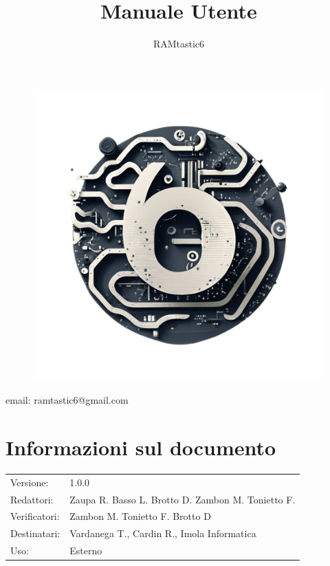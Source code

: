 \documentclass[12pt, oneside]{article}
\author{RAMtastic6}
\begin{document}
\thispagestyle{empty}
\title{Manuale Utente}
\maketitle
\begin{figure}[h]
  \centering
  \includegraphics[scale=0.3]{logo.png}
\end{figure}
\begin{center}
    email: ramtastic6@gmail.com
\end{center}

\section*{Informazioni sul documento} 
\begin{tabular}{ll}
Versione: & 1.0.0 \\
Redattori: &  Zaupa R. Basso L. Brotto D. Zambon M. Tonietto F.\\ 
Verificatori: & Zambon M. Tonietto F. Brotto D\\
Destinatari: & Vardanega T., Cardin R., Imola Informatica \\
Uso: & Esterno
\end{tabular}
\newpage

\end{document}
